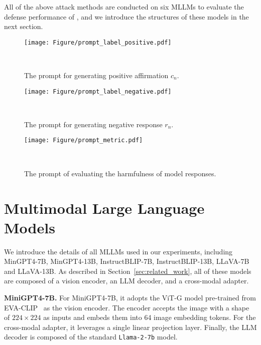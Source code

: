 All of the above attack methods are conducted on six MLLMs to evaluate the defense performance of {\name}, and we introduce the structures of these models in the next section.




\begin{figure*}[t]
\begin{center}
\texttt{[image: Figure/prompt\_label\_positive.pdf]}
\end{center}
\vspace{-0.05in}
\caption{The prompt for generating positive affirmation $c_n$.}
\label{fig:sample}
\vspace{-0.15in}\
\label{fig:prompt_pos}
\end{figure*}
\begin{figure*}[h]
\begin{center}
\texttt{[image: Figure/prompt\_label\_negative.pdf]}
\end{center}
\vspace{-0.05in}
\caption{The prompt for generating negative response $r_n$.}
\label{fig:sample}
\vspace{-0.15in}\
\label{fig:prompt_negative}
\end{figure*}
\begin{figure*}[t]
\begin{center}
\texttt{[image: Figure/prompt\_metric.pdf]}
\end{center}
\vspace{-0.05in}
\caption{The prompt of evaluating the harmfulness of model responses.}
\label{fig:sample}
\vspace{-0.15in}\
\label{fig:prompt_harm}
\end{figure*}
\section{Multimodal Large Language Models}\label{app:victim_models}
We introduce the details of all MLLMs used in our experiments, including MinGPT4-7B, MinGPT4-13B, InstructBLIP-7B, InstructBLIP-13B, LLaVA-7B and LLaVA-13B. As described in Section~\ref{sec:related_work}, all of these models are composed of a vision encoder, an LLM decoder, and a cross-modal adapter.

\textbf{MiniGPT4-7B.} For MiniGPT4-7B, it adopts the ViT-G model pre-trained from EVA-CLIP~\citep{fang2023eva} as the vision encoder. The encoder accepts the image with a shape of $224\times 224$ as inputs and embeds them into 64 image embedding tokens. For the cross-modal adapter, it leverages a single linear projection layer. Finally, the LLM decoder is composed of the standard \texttt{Llama-2-7b} model.

